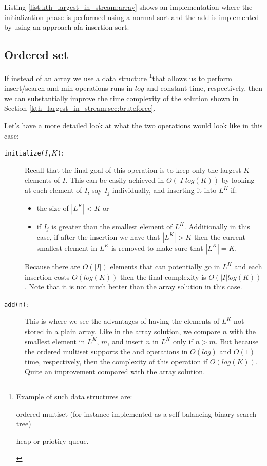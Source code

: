 Listing \ref{list:kth_largest_in_stream:array} shows an implementation where the initialization
phase is performed using a normal sort and the add is implemented by using an approach a\' la
insertion-sort.



\subsection{Ordered set}
\label{kth_largest_in_stream:sec:map}
If instead of an array we use a data structure \footnote{Example of such data structures are:
\begin{enumerate*}
	\item ordered multiset (for instance implemented as a self-balancing binary search tree)
	\item heap or priotiry queue. \end{enumerate*}}that allows us to perform insert/search and min
operations runs in $log$ and constant time, respectively, then we can  substantially improve the
time complexity of the solution shown in Section \ref{kth_largest_in_stream:sec:bruteforce}.

Let's have a more detailed look  at what the two operations would look like in this case:
\begin{description}
	\item[\texttt{initialize($I$,$K$)}:] Recall that the final goal of this operation is to keep
	only  the largest $K$ elements of $I$. This can be easily achieved in $O(|I|log(K))$ by looking
	at each element of $I$, say $I_j$ individually,  and inserting it into $L^K$ if:
	\begin{itemize}
		\item the size of $|L^K| < K$ or 
		\item if $I_j$ is greater than the smallest element of $L^K$. Additionally in this case, if
		after the insertion we have that $|L^K|  > K$ then the current smallest element in $L^K$ is
		removed to make sure that $|L^K|=K$.
	\end{itemize}
	Because there are $O(|I|)$ elements that can potentially go in $L^K$ and each insertion costs
	$O(log(K))$ then the final complexity is $O(|I|log(K))$. Note that it is not much better than
	the array solution in this case.
	\item [\texttt{add(n)}:] This is where we see the advantages of having the elements of  $L^K$
	not stored in a plain array. Like in the array solution, we compare $n$ with the smallest
	element in $L^K$, $m$, and insert $n$ in $L^K$ only if $n>m$. But because the ordered multiset
	supports the  and  operations in $O(log)$ and $O(1)$ time,
	respectively, then the complexity of this operation if $O(log(K))$. Quite an improvement compared with
	the array solution.
\end{description}


